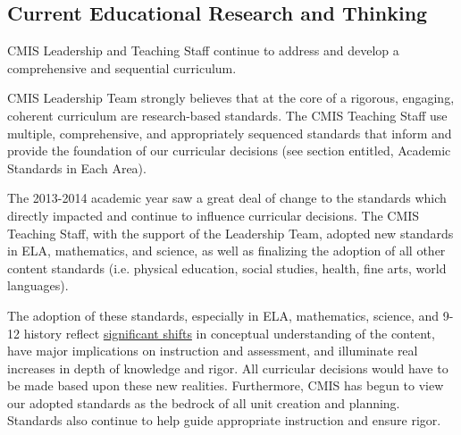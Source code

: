 \documentclass{report}
\begin{document}
\subsection{Current Educational Research and Thinking}


\begin{findings}
CMIS Leadership and Teaching Staff continue to address and develop a comprehensive and sequential curriculum. 

\href{https://drive.google.com/drive/folders/0B71_pYxcTLo-NGJ4N0RQWXRTNE0?usp=sharing}{}

CMIS Leadership Team strongly believes that at the core of a rigorous, engaging, coherent curriculum are research-based standards. The  CMIS Teaching Staff use multiple, comprehensive, and appropriately sequenced standards that inform and provide the foundation of our curricular decisions (see section entitled, Academic Standards in Each Area). 

The 2013-2014 academic year saw a great deal of change to the standards which directly impacted and continue to influence curricular decisions. The CMIS Teaching Staff, with the support of the Leadership Team, adopted new standards in ELA, mathematics, and science, as well as finalizing the adoption of all other content standards (i.e. physical education, social studies, health, fine arts, world languages). 

The adoption of these standards, especially in ELA, mathematics, science, and 9-12 history  reflect \href{https://docs.google.com/a/cmis.ac.th/document/d/1XkW4kx-s2f5rP1zWNLqi14WBQ9fHp9aFRP2op2RPRQE/edit?usp=sharing}{significant shifts} in conceptual understanding of the content, have major implications on instruction and assessment, and illuminate real increases in depth of knowledge and rigor. All curricular decisions would have to be made based upon these new realities. Furthermore, CMIS has begun to view our adopted standards as the bedrock of all unit creation and planning. Standards also continue to help guide appropriate instruction and ensure rigor. 


\end{findings}
\end{document}
